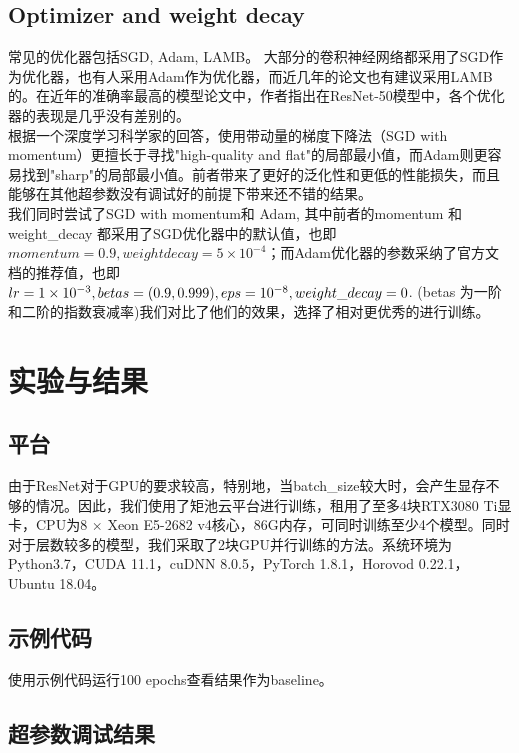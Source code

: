 \documentclass[hyperref, UTF8, 12pt]{article}
\theoremstyle{definition}
\begin{document}
\subsection{Optimizer and weight decay}
常见的优化器包括SGD, Adam, LAMB。 大部分的卷积神经网络都采用了SGD作为优化器，也有人采用Adam作为优化器，而近几年的论文也有建议采用LAMB的。在近年的准确率最高的模型论文中，作者指出在ResNet-50模型中，各个优化器的表现是几乎没有差别的。\cite{dosovitskiy2021image}\\
\indent
根据一个深度学习科学家的回答\cite{QuoraAnswer}，使用带动量的梯度下降法（SGD with momentum）更擅长于寻找"high-quality and flat"的局部最小值，而Adam则更容易找到"sharp"的局部最小值。前者带来了更好的泛化性和更低的性能损失，而且能够在其他超参数没有调试好的前提下带来还不错的结果。\\
\indent
我们同时尝试了SGD with momentum和 Adam, 其中前者的momentum 和weight\_decay 都采用了SGD优化器中的默认值，也即$momentum = 0.9, weight decay = 5 \times 10 ^ {-4}$；而Adam优化器的参数采纳了官方文档的推荐值，也即$lr = 1 \times 10^{-3}, \space betas=(0.9, 0.999), \space eps = 10 ^ {-8}, \space weight\_decay = 0$. (betas 为一阶和二阶的指数衰减率)我们对比了他们的效果，选择了相对更优秀的进行训练。

\section{实验与结果}
\subsection{平台}
由于ResNet对于GPU的要求较高，特别地，当batch\_size较大时，会产生显存不够的情况。因此，我们使用了矩池云平台进行训练，租用了至多4块RTX3080 Ti显卡，CPU为8 $\times$ Xeon E5-2682 v4核心，86G内存，可同时训练至少4个模型。同时对于层数较多的模型，我们采取了2块GPU并行训练的方法。系统环境为Python3.7，CUDA 11.1，cuDNN 8.0.5，PyTorch 1.8.1，Horovod 0.22.1，Ubuntu 18.04。

\subsection{示例代码}
使用示例代码运行100 epochs查看结果作为baseline。

\subsection{超参数调试结果}
\end{document}
